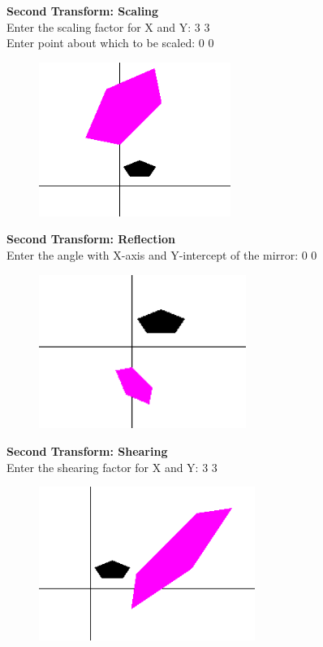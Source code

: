 \documentclass[9pt,letterpaper]{article}
\begin{document}
\newpage

\textbf{\large{Second Transform: Scaling}}\\
Enter the scaling factor for X and Y: 3 3\\
Enter point about which to be scaled: 0 0\\

\begin{figure}[h]
    \centering
    \includegraphics[height=5cm]{CompositeTransformations/Outputs/RotateScale.png}
\end{figure}

\textbf{\large{Second Transform: Reflection}}\\
Enter the angle with X-axis and Y-intercept of the mirror: 0 0\\

\begin{figure}[h]
    \centering
    \includegraphics[height=5cm]{CompositeTransformations/Outputs/RotateReflect.png}
\end{figure}

\newpage

\textbf{\large{Second Transform: Shearing}}\\
Enter the shearing factor for X and Y: 3 3 \\

\begin{figure}[h]
    \centering
    \includegraphics[height=5cm]{CompositeTransformations/Outputs/RotateShear.png}
\end{figure}
\end{document}

